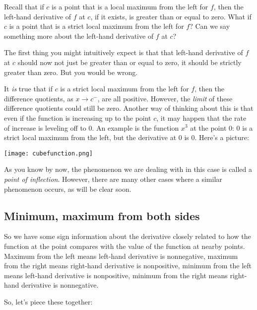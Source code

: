 \documentclass[10pt]{amsart}
\begin{document}
Recall that if $c$ is a point that is a local maximum from the left
for $f$, then the left-hand derivative of $f$ at $c$, if it exists, is
greater than or equal to zero. What if $c$ is a point that is a strict
local maximum from the left for $f$? Can we say something more about
the left-hand derivative of $f$ at $c$?

The first thing you might intuitively expect is that that left-hand
derivative of $f$ at $c$ should now not just be greater than or equal
to zero, it should be strictly greater than zero. But you would be
wrong.

It {\em is} true that if $c$ is a strict local maximum from the left
for $f$, then the difference quotients, as $x \to c^-$, are all
positive. However, the {\em limit} of these difference quotients could
still be zero. Another way of thinking about this is that even if the
function is increasing up to the point $c$, it may happen that the
rate of increase is leveling off to $0$. An example is the function
$x^3$ at the point $0$: $0$ is a strict local maximum from the left,
but the derivative at $0$ is $0$. Here's a picture:

\texttt{[image: cubefunction.png]}

As you know by now, the phenomenon we are dealing with in this case is
called a {\em point of inflection}. However, there are many other
cases where a similar phenomenon occurs, as will be clear soon.

\subsection{Minimum, maximum from both sides}

So we have some sign information about the derivative closely related
to how the function at the point compares with the value of the
function at nearby points. Maximum from the left means left-hand
derivative is nonnegative, maximum from the right means right-hand
derivative is nonpositive, minimum from the left means left-hand
derivative is nonpositive, minimum from the right means right-hand
derivative is nonnegative.

So, let's piece these together:
\end{document}
